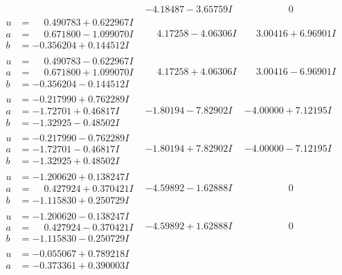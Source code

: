 \documentclass[1p]{elsarticle_modified}
\theoremstyle{definition}
\begin{document}
$$\begin{array}{c|c|c}
 & -4.18487 - 3.65759 I & \phantom{-0.000000 } 0 \\ \hline\begin{aligned}
u &= \phantom{-}0.490783 + 0.622967 I \\
a &= \phantom{-}0.671800 - 1.099070 I \\
b &= -0.356204 + 0.144512 I\end{aligned}
 & \phantom{-}4.17258 - 4.06306 I & \phantom{-}3.00416 + 6.96901 I \\ \hline\begin{aligned}
u &= \phantom{-}0.490783 - 0.622967 I \\
a &= \phantom{-}0.671800 + 1.099070 I \\
b &= -0.356204 - 0.144512 I\end{aligned}
 & \phantom{-}4.17258 + 4.06306 I & \phantom{-}3.00416 - 6.96901 I \\ \hline\begin{aligned}
u &= -0.217990 + 0.762289 I \\
a &= -1.72701 + 0.46817 I \\
b &= -1.32925 - 0.48502 I\end{aligned}
 & -1.80194 - 7.82902 I & -4.00000 + 7.12195 I \\ \hline\begin{aligned}
u &= -0.217990 - 0.762289 I \\
a &= -1.72701 - 0.46817 I \\
b &= -1.32925 + 0.48502 I\end{aligned}
 & -1.80194 + 7.82902 I & -4.00000 - 7.12195 I \\ \hline\begin{aligned}
u &= -1.200620 + 0.138247 I \\
a &= \phantom{-}0.427924 + 0.370421 I \\
b &= -1.115830 + 0.250729 I\end{aligned}
 & -4.59892 - 1.62888 I & \phantom{-0.000000 } 0 \\ \hline\begin{aligned}
u &= -1.200620 - 0.138247 I \\
a &= \phantom{-}0.427924 - 0.370421 I \\
b &= -1.115830 - 0.250729 I\end{aligned}
 & -4.59892 + 1.62888 I & \phantom{-0.000000 } 0 \\ \hline\begin{aligned}
u &= -0.055067 + 0.789218 I \\
a &= -0.373361 + 0.390003 I \\

\end{aligned}
\end{array}$$
\end{document}
